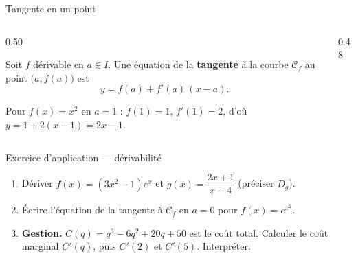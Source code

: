 \documentclass[aspectratio=169,11pt]{beamer}
\newcommand{\key}[1]{\textbf{\color{DarkBlue}#1}}
\begin{document}
\begin{frame}{Tangente en un point}
	\begin{columns}[c]
		\begin{column}{0.50\textwidth}
			\begin{definitionbox}[Tangente]
				Soit $f$ dérivable en $a\in I$. Une équation de la \key{tangente}
				à la courbe $\mathcal{C}_f$ au point $\bigl(a,f(a)\bigr)$ est
				\[
					y=f(a)+f'(a)\,(x-a).
				\]
			\end{definitionbox}
			\vspace{0.15cm}
			\begin{exemplebox}
				Pour $f(x)=x^2$ en $a=1$ : $f(1)=1$, $f'(1)=2$, d'où
				$y=1+2(x-1)=2x-1$.
			\end{exemplebox}
		\end{column}
		\begin{column}{0.48\textwidth}
		\end{column}
	\end{columns}
\end{frame}

\begin{frame}{Exercice d'application --- dérivabilité}
	\begin{exercicebox}[Exercice 2.7]
		\begin{enumerate}
			\item Dériver $f(x)=(3x^2-1)e^x$ et $g(x)=\dfrac{2x+1}{x-4}$ (préciser $D_g$).
			\item Écrire l'équation de la tangente à $\mathcal{C}_f$ en $a=0$ pour $f(x)=e^{x^2}$.
			\item \textbf{Gestion.} $C(q)=q^3-6q^2+20q+50$ est le coût total.
			Calculer le coût marginal $C'(q)$, puis $C'(2)$ et $C'(5)$. Interpréter.
		\end{enumerate}
	\end{exercicebox}
\end{frame}
\end{document}
